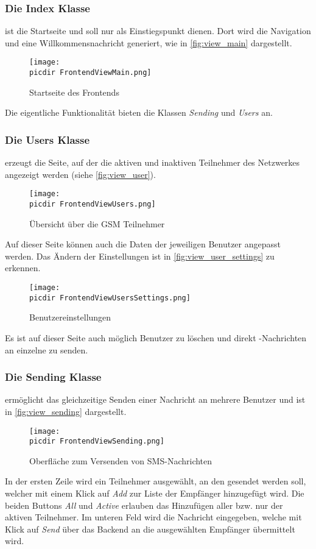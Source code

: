 \FloatBarrier
\subsubsection*{Die Index Klasse} ist die Startseite und soll nur als Einstiegspunkt dienen. Dort wird die Navigation und eine Willkommensnachricht generiert, wie in \autoref{fig:view_main} dargestellt.
\begin{figure}[h]
	\centering
	\texttt{[image: \\picdir FrontendViewMain.png]}
	\caption{Startseite des Frontends}
	\label{fig:view_main}
\end{figure}
Die eigentliche Funktionalität bieten die Klassen \emph{Sending} und \emph{Users} an. 

\FloatBarrier
\subsubsection*{Die Users Klasse} erzeugt die Seite, auf der die aktiven und inaktiven Teilnehmer des Netzwerkes angezeigt werden (siehe \autoref{fig:view_user}). 
\begin{figure}[h]
	\centering
	\texttt{[image: \\picdir FrontendViewUsers.png]}
	\caption{Übersicht über die GSM Teilnehmer}
	\label{fig:view_user}
\end{figure}
Auf dieser Seite können auch die Daten der jeweiligen Benutzer angepasst werden. Das Ändern der Einstellungen ist in \autoref{fig:view_user_settings} zu erkennen.
\begin{figure}[h]
	\centering
	\texttt{[image: \\picdir FrontendViewUsersSettings.png]}
	\caption{Benutzereinstellungen}
	\label{fig:view_user_settings}
\end{figure}
Es ist auf dieser Seite auch möglich Benutzer zu löschen und direkt \SMS-Nachrichten an einzelne zu senden.

\FloatBarrier
\subsubsection*{Die Sending Klasse}
ermöglicht das gleichzeitige Senden einer Nachricht an mehrere Benutzer und ist in \autoref{fig:view_sending} dargestellt.
\begin{figure}[h!]
	\centering
	\texttt{[image: \\picdir FrontendViewSending.png]}
	\caption{Oberfläche zum Versenden von \acs*{SMS}-Nachrichten}
	\label{fig:view_sending}
\end{figure}
In der ersten Zeile wird ein Teilnehmer ausgewählt, an den gesendet werden soll, welcher mit einem Klick auf \emph{Add} zur Liste der Empfänger hinzugefügt wird. Die beiden Buttons \emph{All} und \emph{Active} erlauben das Hinzufügen aller bzw. nur der aktiven Teilnehmer. Im unteren Feld wird die Nachricht eingegeben, welche mit Klick auf \emph{Send} über das Backend an die ausgewählten Empfänger übermittelt wird.


